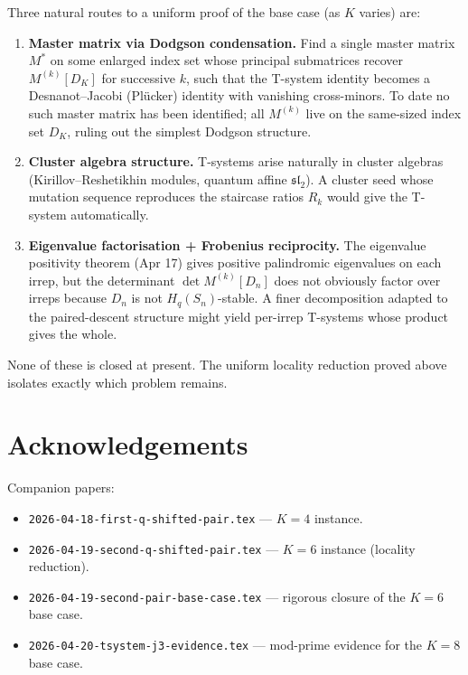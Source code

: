 \documentclass[11pt]{article}
\theoremstyle{definition}
\begin{document}
Three natural routes to a uniform proof of the base case (as $K$ varies) are:
\begin{enumerate}
\item \textbf{Master matrix via Dodgson condensation.}  Find a single master matrix $M^*$ on some enlarged index set whose principal submatrices recover $M^{(k)}[D_K]$ for successive $k$, such that the T-system identity becomes a Desnanot--Jacobi (Plücker) identity with vanishing cross-minors.  To date no such master matrix has been identified; all $M^{(k)}$ live on the same-sized index set $D_K$, ruling out the simplest Dodgson structure.
\item \textbf{Cluster algebra structure.}  T-systems arise naturally in cluster algebras (Kirillov--Reshetikhin modules, quantum affine $\mathfrak{sl}_2$).  A cluster seed whose mutation sequence reproduces the staircase ratios $R_k$ would give the T-system automatically.
\item \textbf{Eigenvalue factorisation + Frobenius reciprocity.}  The eigenvalue positivity theorem (Apr 17) gives positive palindromic eigenvalues on each irrep, but the determinant $\det M^{(k)}[D_n]$ does not obviously factor over irreps because $D_n$ is not $H_q(S_n)$-stable. A finer decomposition adapted to the paired-descent structure might yield per-irrep T-systems whose product gives the whole.
\end{enumerate}
None of these is closed at present.  The uniform locality reduction proved above isolates exactly which problem remains.

\section*{Acknowledgements}

Companion papers:
\begin{itemize}
\item \texttt{2026-04-18-first-q-shifted-pair.tex} --- $K = 4$ instance.
\item \texttt{2026-04-19-second-q-shifted-pair.tex} --- $K = 6$ instance (locality reduction).
\item \texttt{2026-04-19-second-pair-base-case.tex} --- rigorous closure of the $K = 6$ base case.
\item \texttt{2026-04-20-tsystem-j3-evidence.tex} --- mod-prime evidence for the $K = 8$ base case.
\end{itemize}
\end{document}
